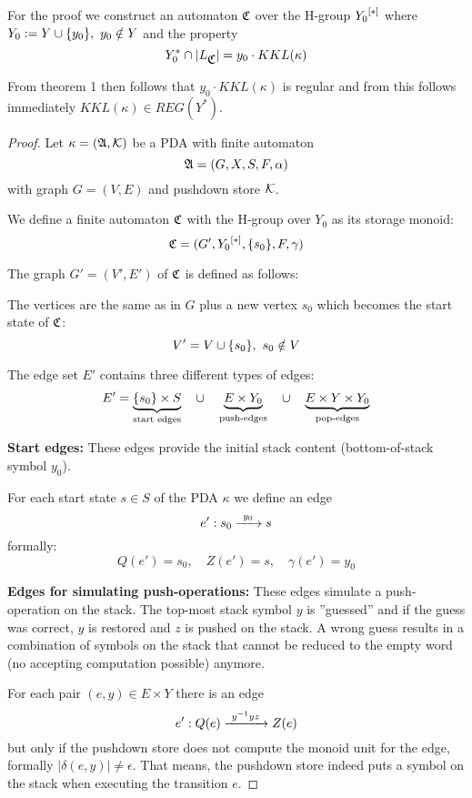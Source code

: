 For the proof we construct an automaton $\mbox{$\mathfrak{C}$}$ over the H-group $\mbox{${Y_0}^{[*]}$}$
where $Y_0 := Y \cup \mbox{$\{y_0\}$},\ y_0 \notin Y$ and the property
\[ Y_0^* \cap |L_{\mbox{$\mathfrak{C}$}}| = y_0 \cdot KKL(\kappa) \]

From theorem 1 then follows that $y_0 \cdot KKL(\kappa)$ is regular and from
this follows immediately $KKL(\kappa) \in REG(Y^*)$.


\begin{proof}
Let $\kappa = (\mbox{$\mathfrak{A}$}, \mbox{$\mathcal{K}$})$ be a PDA with finite automaton
\[ \mbox{$\mathfrak{A}$} = (G, X, S, F, \alpha) \]
with graph $G = (V, E)$ and pushdown store $\mbox{$\mathcal{K}$}$.

We define a finite automaton $\mbox{$\mathfrak{C}$}$ with the H-group over $Y_0$ as its storage
monoid:
\[ \mbox{$\mathfrak{C}$} = (G', \mbox{${Y_0}^{[*]}$}, \mbox{$\{s_0\}$}, F, \gamma) \]

The graph $G'=(V',E')$ of $\mbox{$\mathfrak{C}$}$ is defined as follows:

The vertices are the same as in $G$ plus a new vertex $s_0$ which becomes the
start state of $\mbox{$\mathfrak{C}$}$:
\[ V' = V \cup \mbox{$\{s_0\}$},\ s_0 \notin V \]

The edge set $E'$ contains three different types of edges:
\[ E' = \underbrace{\mbox{$\{s_0\}$} \times S}_{\text{start edges}} \quad\cup\quad
\underbrace{E \times Y_0}_{\text{push-edges}} \quad\cup\quad \underbrace{E
\times Y \times Y_0}_{\text{pop-edges}}
\]

{\bf Start edges:} These edges provide the initial
stack content (bottom-of-stack symbol $y_0$).

For each start state $s \in S$ of the PDA $\kappa$ we define an edge
\[ e': s_0 \xrightarrow{\ {y_0}\ } s\]
formally:
\[ Q(e') = s_0,\quad Z(e') = s,\quad \gamma(e') = y_0 \]

\bigskip
{\bf Edges for simulating push-operations:} These edges simulate a
push-operation on the stack.
The top-most stack symbol $y$ is ''guessed'' and if the guess was correct, $y$ is
restored and $z$ is pushed on the stack. A wrong guess results in a combination of symbols on 
the stack that cannot be reduced to the empty word (no accepting computation
possible) anymore.
 
For each pair $(e, y) \in E \times Y$ there is an edge
\[ e': Q(e) \xrightarrow{\ {y^{-1} y z}\ } Z(e)\]
but only if the pushdown store does not compute the monoid unit for the edge,
formally $|\delta(e, y)| \neq \epsilon$. That means, the pushdown store indeed
puts a symbol on the stack when executing the transition $e$.


\end{proof}
